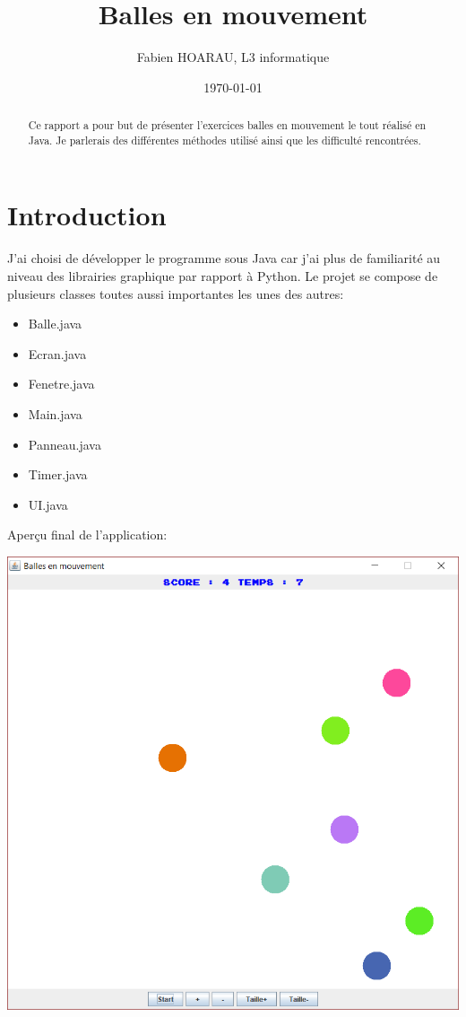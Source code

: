 \documentclass{article}
\title{Balles en mouvement}
\author{Fabien HOARAU, L3 informatique}
\date{\today}
\begin{document}
\maketitle %

\begin{abstract}
Ce rapport a pour but de présenter l'exercices balles en mouvement le tout réalisé en Java.
Je parlerais des différentes méthodes utilisé ainsi que les 	difficulté rencontrées.
\end{abstract}

\section{Introduction}
	\label{section:intro} %
J'ai choisi de développer le programme sous Java car j'ai plus de 	familiarité au niveau des librairies graphique par rapport à 	Python.
Le projet se compose de plusieurs classes toutes aussi 	importantes les unes des autres:

\begin{itemize}
	\item Balle.java
	\item Ecran.java
	\item Fenetre.java
	\item Main.java
	\item Panneau.java
	\item Timer.java
	\item UI.java
\end{itemize}

\vspace{5mm}

Aperçu final de l'application:

\begin{center}
  	\includegraphics[scale=0.6]{apercu.png}
\end{center}
\end{document}
